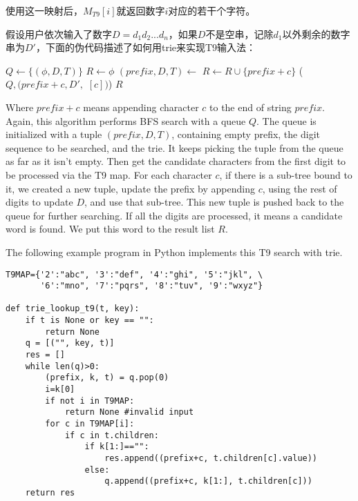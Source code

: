 \documentclass[UTF8]{article}
\begin{document}
使用这一映射后，$M_{T9}[i]$就返回数字$i$对应的若干个字符。

假设用户依次输入了数字$D = d_1d_2...d_n$，如果$D$不是空串，记除$d_1$以外剩余的数字串为$D'$，下面的伪代码描述了如何用trie来实现T9输入法：

\begin{algorithmic}[1]
  \State $Q \gets \{(\phi, D, T)\}$
  \State $R \gets \phi$
    \State $(prefix, D, T) \gets$ 
          \State $R \gets R \cup \{prefix + c\}$
        \Else
          \State {}($Q, (prefix + c, D', $ $[c])$)
        \EndIf
      \EndIf
    \EndFor
  \EndWhile
  \State \Return $R$
\EndFunction
\end{algorithmic}

Where $prefix + c$ means appending character $c$ to the end of string $prefix$.
Again, this algorithm performs BFS search with a queue $Q$. The queue is
initialized with a tuple $(prefix, D, T)$, containing empty prefix, the digit sequence to be
searched, and the trie. It keeps picking the tuple from the queue as far as
it isn't empty. Then get the candidate characters from the first digit to
be processed via the T9 map. For each character $c$, if there is a sub-tree
bound to it, we created a new tuple, update the prefix by appending $c$,
using the rest of digits to update $D$, and use that sub-tree. This new tuple
is pushed back to the queue for further searching. If all the digits are
processed, it means a candidate word is found. We put this word to the
result list $R$.

The following example program in Python implements this T9 search with trie.

\lstset{language=Python}
\begin{lstlisting}
T9MAP={'2':"abc", '3':"def", '4':"ghi", '5':"jkl", \
       '6':"mno", '7':"pqrs", '8':"tuv", '9':"wxyz"}

def trie_lookup_t9(t, key):
    if t is None or key == "":
        return None
    q = [("", key, t)]
    res = []
    while len(q)>0:
        (prefix, k, t) = q.pop(0)
        i=k[0]
        if not i in T9MAP:
            return None #invalid input
        for c in T9MAP[i]:
            if c in t.children:
                if k[1:]=="":
                    res.append((prefix+c, t.children[c].value))
                else:
                    q.append((prefix+c, k[1:], t.children[c]))
    return res
\end{lstlisting}
\end{document}
